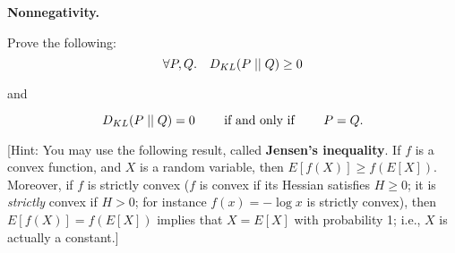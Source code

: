 \item{} \textbf{Nonnegativity.}

Prove the following:
$$\forall P, Q. \quad D_{KL}(P\mid \mid Q) \geq 0$$

and

\[
D_{KL}(P\mid \mid Q) = 0 \quad\quad\text{ if and only if }\quad\quad P=Q.
\]

[Hint: You may use the following result, called {\bf Jensen's inequality}.  If $f$ is a convex function, and $X$ is a random variable, then $E[f(X)] \geq f(E[X])$. Moreover, if $f$ is strictly convex ($f$ is convex if its Hessian satisfies $H \geq 0$; it is \emph{strictly} convex if $H > 0$; for instance $f(x) = -\log x$ is strictly convex), then $E[f(X)] = f(E[X])$ implies that $X=E[X]$ with probability 1; i.e., $X$ is actually a constant.]
